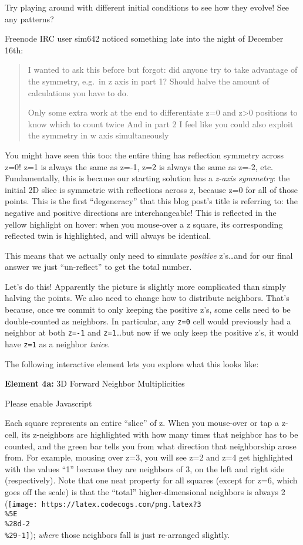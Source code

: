 \documentclass[]{article}
\begin{document}
Try playing around with different initial conditions to see how they evolve! See
any patterns?

Freenode IRC user sim642 noticed something late into the night of December 16th:

\begin{quote}
I wanted to ask this before but forgot: did anyone try to take advantage of the
symmetry, e.g.~in z axis in part 1? Should halve the amount of calculations you
have to do.

Only some extra work at the end to differentiate z=0 and z\textgreater0
positions to know which to count twice And in part 2 I feel like you could also
exploit the symmetry in w axis simultaneously
\end{quote}

You might have seen this too: the entire thing has reflection symmetry across
z=0! z=1 is always the same as z=-1, z=2 is always the same as z=-2, etc.
Fundamentally, this is because our starting solution has a \emph{z-axis
symmetry}: the initial 2D slice is symmetric with reflections across z, because
z=0 for all of those points. This is the first ``degeneracy'' that this blog
post's title is referring to: the negative and positive directions are
interchangeable! This is reflected in the yellow highlight on hover: when you
mouse-over a z square, its corresponding reflected twin is highlighted, and will
always be identical.

This means that we actually only need to simulate \emph{positive} z's\ldots and
for our final answer we just ``un-reflect'' to get the total number.

Let's do this! Apparently the picture is slightly more complicated than simply
halving the points. We also need to change how to distribute neighbors. That's
because, once we commit to only keeping the positive z's, some cells need to be
double-counted as neighbors. In particular, any \texttt{z=0} cell would
previously had a neighbor at both \texttt{z=-1} and \texttt{z=1}\ldots but now
if we only keep the positive z's, it would have \texttt{z=1} as a neighbor
\emph{twice}.

The following interactive element lets you explore what this looks like:

\leavevmode\hypertarget{golSyms3DForward}{}%
\textbf{Element 4a:} 3D Forward Neighbor Multiplicities

\leavevmode\hypertarget{golSyms3DForwardCont}{}%
Please enable Javascript

Each square represents an entire ``slice'' of z. When you mouse-over or tap a
z-cell, its z-neighbors are highlighted with how many times that neighbor has to
be counted, and the green bar tells you from what direction that neighborship
arose from. For example, mousing over z=3, you will see z=2 and z=4 get
highlighted with the values ``1'' because they are neighbors of 3, on the left
and right side (respectively). Note that one neat property for all squares
(except for z=6, which goes off the scale) is that the ``total''
higher-dimensional neighbors is always 2
(\texttt{[image: https://latex.codecogs.com/png.latex?3\\\%5E\\\%28d-2\\\%29-1]});
\emph{where} those neighbors fall is just re-arranged slightly.
\end{document}
